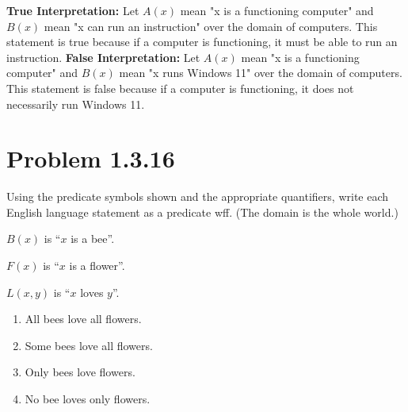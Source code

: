\documentclass[12pt]{article}
\begin{document}
\textbf{True Interpretation:} Let \(A(x)\) mean "x is a functioning computer" and \(B(x)\) mean "x can run an instruction" over the domain of computers. This statement is true because if a computer is functioning, it must be able to run an instruction.
\newline
\textbf{False Interpretation:} Let \(A(x)\) mean "x is a functioning computer" and \(B(x)\) mean "x runs Windows 11" over the domain of computers. This statement is false because if a computer is functioning, it does not necessarily run Windows 11.


\newpage
\section*{Problem 1.3.16}
Using the predicate symbols shown and the appropriate quantifiers, write each English language statement as a predicate wff. (The domain is the whole world.)

\( B(x) \) is ``\( x \) is a bee''.

\( F(x) \) is ``\( x \) is a flower''.

\( L(x, y) \) is ``\( x \) loves \( y \)''.

\begin{enumerate}
    \item[a.] All bees love all flowers.
    \item[b.] Some bees love all flowers.
    \item[e.] Only bees love flowers.
    \item[g.] No bee loves only flowers.
\end{enumerate}
\end{document}
